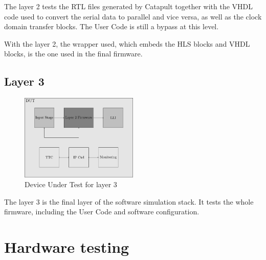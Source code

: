 The layer 2 tests the RTL files generated by Catapult together with the VHDL code used to convert the serial data to parallel and vice versa, as well as the clock domain transfer blocks. The User Code is still a bypass at this level. 

With the layer 2, the wrapper used, which embeds the HLS blocks and VHDL blocks, is the one used in the final firmware.

\subsection{Layer 3}

\begin{figure}[htb]
    \centering
    \includegraphics[width=0.5\textwidth]{diagrams/l3}
    \caption{Device Under Test for layer 3}
    \label{fig:dut-l3}
\end{figure}

The layer 3 is the final layer of the software simulation stack. It tests the whole firmware, including the User Code and software configuration.

\section{Hardware testing}
